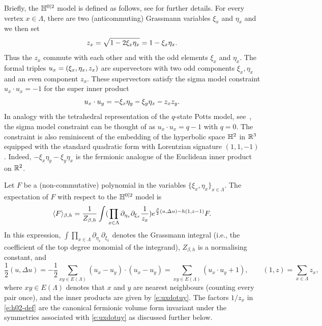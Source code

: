 \documentclass[11pt]{amsart}
\numberwithin{equation}{section}
\numberwithin{theorem}{section}
\newcommand{\1}{{\bf 1}}
\begin{document}
Briefly, the $\mathbb{H}^{0|2}$
model is defined as follows, see
\cite[Section~2]{MR4218682} for further details.  For every vertex
$x\in \Lambda$, there are two (anticommuting) Grassmann variables
$\xi_x$ and $\eta_x$ and we then set
\begin{equation}
  z_x = \sqrt{1-2\xi_x\eta_x} = 1-\xi_x\eta_x.
\end{equation}
Thus the $z_x$ commute with each other and with the odd elements
$\xi_x$ and $\eta_x$.  The formal triples
$u_x=(\xi_x,\eta_x,z_x)$ are supervectors with two odd components
$\xi_x,\eta_x$ and an even component $z_x$.  These supervectors
satisfy the sigma model constraint $u_x\cdot u_x=-1$ for the super
inner product
\begin{equation}
  \label{e:uxdotuy}
  u_x\cdot u_y = -\xi_x\eta_y-\xi_y\eta_x - z_xz_y.
\end{equation}
In analogy with the tetrahedral representation of the $q$-state Potts
model, see~\cite[Section~2.2]{MR2581604}, the sigma model constraint
can be thought of as $u_x\cdot u_x = q-1$ with $q=0$. The constraint
is also reminiscent of the embedding of the hyperbolic space $\mathbb{H}^2$
in $\mathbb{R}^3$ equipped with the standard quadratic form with Lorentzian
signature $(1, 1, -1)$. Indeed, $-\xi_x\eta_y-\xi_y\eta_x$ is the
fermionic analogue of the Euclidean inner product on $\mathbb{R}^2$.

Let $F$ be a (non-commutative) polynomial in the variables
$\{\xi_{x},\eta_{x}\}_{x\in \Lambda}$. The expectation of $F$ with
respect to the $\mathbb{H}^{0|2}$ model is
\begin{equation}
  \label{e:h02-def}
  \langle F \rangle_{\beta,h} = \frac{1}{Z_{\beta,h}}\int (\prod_{x\in\Lambda} \partial_{\eta_x}\partial_{\xi_x} \frac{1}{z_x}) e^{\frac{\beta}{2} (u,\Delta u) - h(1,z-1)} F
  .
\end{equation}
In this expression,
$\int \prod_{x\in\Lambda} \partial_{\eta_x}\partial_{\xi_x}$ denotes
the Grassmann integral (i.e., the coefficient of the top degree
monomial of the integrand), $Z_{\beta,h}$ is a normalising constant, and 
\begin{equation}
  \frac12
  (u,\Delta u) = -\frac12 \sum_{xy\in E(\Lambda) }
  (u_x-u_y)\cdot(u_x-u_y)
  = \sum_{xy\in E(\Lambda) }
  (u_x\cdot u_y+1),
  \qquad (1,z) = \sum_{x\in \Lambda} z_x,
\end{equation}
where $xy\in E(\Lambda)$ denotes that $x$ and $y$ are nearest
neighbours (counting every pair once), and the inner products are
given by \eqref{e:uxdotuy}.  The factors $1/z_x$ in \eqref{e:h02-def}
are the canonical fermionic volume form invariant under the symmetries
associated with \eqref{e:uxdotuy} as discussed further below.
\end{document}
